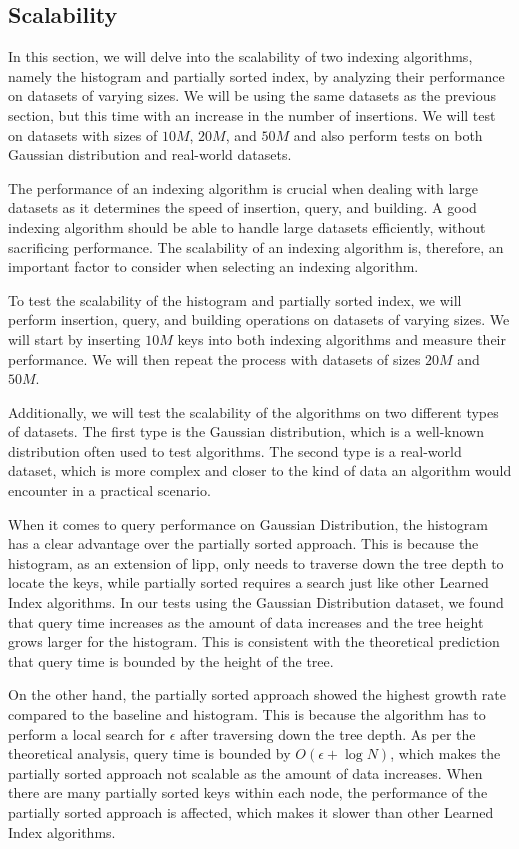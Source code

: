 \documentclass[11pt,a4paper]{article}
\newcommand{\learnindex}{\textsf{Learned Index}\xspace}
\begin{document}
\subsection{Scalability }In this section, we will delve into the scalability of two indexing algorithms, namely the histogram and partially sorted index, by analyzing their performance on datasets of varying sizes. We will be using the same datasets as the previous section, but this time with an increase in the number of insertions. We will test on datasets with sizes of $10M$, $20M$, and $50M$ and also perform tests on both Gaussian distribution and real-world datasets.

The performance of an indexing algorithm is crucial when dealing with large datasets as it determines the speed of insertion, query, and building. A good indexing algorithm should be able to handle large datasets efficiently, without sacrificing performance. The scalability of an indexing algorithm is, therefore, an important factor to consider when selecting an indexing algorithm.

To test the scalability of the histogram and partially sorted index, we will perform insertion, query, and building operations on datasets of varying sizes. We will start by inserting $10M$ keys into both indexing algorithms and measure their performance. We will then repeat the process with datasets of sizes $20M$ and $50M$.

Additionally, we will test the scalability of the algorithms on two different types of datasets. The first type is the Gaussian distribution, which is a well-known distribution often used to test algorithms. The second type is a real-world dataset, which is more complex and closer to the kind of data an algorithm would encounter in a practical scenario.

When it comes to query performance on Gaussian Distribution, the histogram has a clear advantage over the partially sorted approach. This is because the histogram, as an extension of \acrshort{lipp}, only needs to traverse down the tree depth to locate the keys, while partially sorted requires a search just like other \learnindex algorithms. In our tests using the Gaussian Distribution dataset, we found that query time increases as the amount of data increases and the tree height grows larger for the histogram. This is consistent with the theoretical prediction that query time is bounded by the height of the tree.

On the other hand, the partially sorted approach showed the highest growth rate compared to the baseline and histogram. This is because the algorithm has to perform a local search for $\epsilon$ after traversing down the tree depth. As per the theoretical analysis, query time is bounded by $O(\epsilon + \log N)$, which makes the partially sorted approach not scalable as the amount of data increases. When there are many partially sorted keys within each node, the performance of the partially sorted approach is affected, which makes it slower than other \learnindex algorithms.
\end{document}
